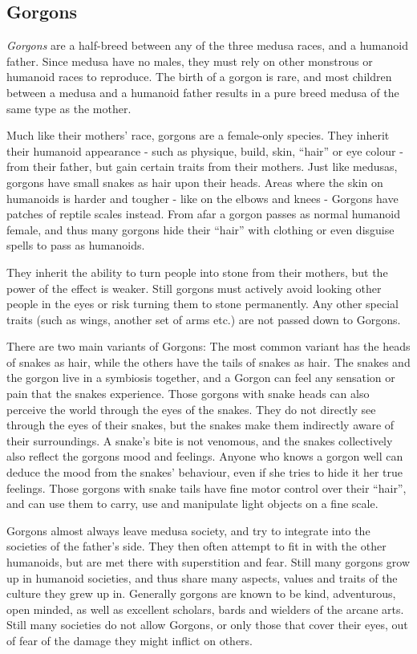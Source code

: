 \subsection{Gorgons}
\label{sec:Gorgons}

\emph{Gorgons} are a half-breed between any of the three medusa races, and a
humanoid father. Since medusa have no males, they must rely on other monstrous
or humanoid races to reproduce. The birth of a gorgon is rare, and most children
between a medusa and a humanoid father results in a pure breed medusa of the
same type as the mother.

Much like their mothers' race, gorgons are a female-only species. They inherit
their humanoid appearance - such as physique, build, skin, ``hair'' or eye
colour - from their father, but gain certain traits from their mothers. Just
like medusas, gorgons have small snakes as hair upon their heads. Areas where
the skin on humanoids is harder and tougher - like on the elbows and knees -
Gorgons have patches of reptile scales instead. From afar a gorgon passes as
normal humanoid female, and thus many gorgons hide their ``hair'' with
clothing or even disguise spells to pass as humanoids.

They inherit the ability to turn people into stone from their mothers, but
the power of the effect is weaker. Still gorgons must actively avoid looking
other people in the eyes or risk turning them to stone permanently. Any other
special traits (such as wings, another set of arms etc.) are not passed down
to Gorgons.

There are two main variants of Gorgons: The most common variant has the heads
of snakes as hair, while the others have the tails of snakes as hair. The
snakes and the gorgon live in a symbiosis together, and a Gorgon can feel
any sensation or pain that the snakes experience. Those gorgons with snake heads
can also perceive the world through the eyes of the snakes. They do not
directly see through the eyes of their snakes, but the snakes make them
indirectly aware of their surroundings. A snake's bite is not venomous, and
the snakes collectively also reflect the gorgons mood and feelings. Anyone who
knows a gorgon well can deduce the mood from the snakes' behaviour, even if
she tries to hide it her true feelings. Those gorgons with snake tails have
fine motor control over their ``hair'', and can use them to carry, use and
manipulate light objects on a fine scale.

Gorgons almost always leave medusa society, and try to integrate into the
societies of the father's side. They then often attempt to fit in with the
other humanoids, but are met there with superstition and fear. Still many
gorgons grow up in humanoid societies, and thus share many aspects, values and
traits of the culture they grew up in. Generally gorgons are known to be kind,
adventurous, open minded, as well as excellent scholars, bards and wielders of
the arcane arts. Still many societies do not allow Gorgons, or only those that
cover their eyes, out of fear of the damage they might inflict on others.

